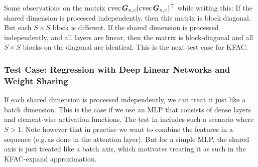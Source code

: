 Some observations on the matrix $\operatorname{cvec} {\bm{G}}_{n,c} (\operatorname{cvec} {\bm{G}}_{n,c})^{\top}$ while writing this: If the shared dimension is processed independently, then this matrix is block diagonal.
But each $S \times S$ block is different.
If the shared dimension is processed independently, and all layers are linear, then the matrix is block-diagonal and all $S \times S$ blocks on the diagonal are identical.
This is the next test case for KFAC.

\subsubsection{Test Case: Regression with Deep Linear Networks and Weight Sharing}\label{sec:expand_sharing}

If each shared dimension is processed independently, we can treat it just like a batch dimension.
This is the case if we use an MLP that consists of dense layers and element-wise activation functions.
The test in  includes such a scenario where $S > 1$.
Note however that in practise we want to combine the features in a sequence (e.g.\,as done in the attention layer).
But for a simple MLP, the shared axis is just treated like a batch axis, which motivates treating it as such in the KFAC-expand approximation.

